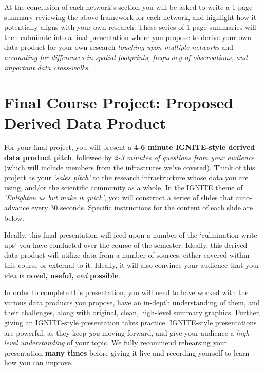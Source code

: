 \documentclass[
  letterpaper,
]{book}
\begin{document}
At the conclusion of each network's section you will be asked to write a
1-page summary reviewing the above framework for each network, and
highlight how it potentially aligns with your own research. These series
of 1-page summaries will then culminate into a final presentation where
you propose to derive your own data product for your own research
\emph{touching upon multiple networks} and \emph{accounting for
differences in spatial footprints, frequency of observations, and
important data cross-walks}.

\section*{Final Course Project: Proposed Derived Data
Product}\label{final-course-project-proposed-derived-data-product}


For your final project, you will present a \textbf{4-6 minute
IGNITE-style derived data product pitch}, followed by \emph{2-3 minutes
of questions from your audience} (which will include members from the
infrastrures we've covered). Think of this project as your \emph{`sales
pitch'} to the research infrastructure whose data you are using, and/or
the scientific community as a whole. In the IGNITE theme of
\emph{`Enlighten us but make it quick'}, you will construct a series of
slides that auto-advance every 30 seconds. Specific instructions for the
content of each slide are below.

Ideally, this final presentation will feed upon a number of the
`culmination write-ups' you have conducted over the course of the
semester. Ideally, this derived data product will utilize data from a
number of sources, either covered within this course or external to it.
Ideally, it will also convince your audience that your idea is
\textbf{novel, useful,} \emph{and} \textbf{possible}.

In order to complete this presentation, you will need to have worked
with the various data products you propose, have an in-depth
understanding of them, and their challenges, along with original, clean,
high-level summary graphics. Further, giving an IGNITE-style
presentation takes practice. IGNITE-style presentations are powerful, as
they keep \emph{you} moving forward, and give your audience a
\emph{high-level understanding} of your topic. We fully recommend
rehearsing your presentation \textbf{many times} before giving it live
and recording yourself to learn how you can improve.
\end{document}
